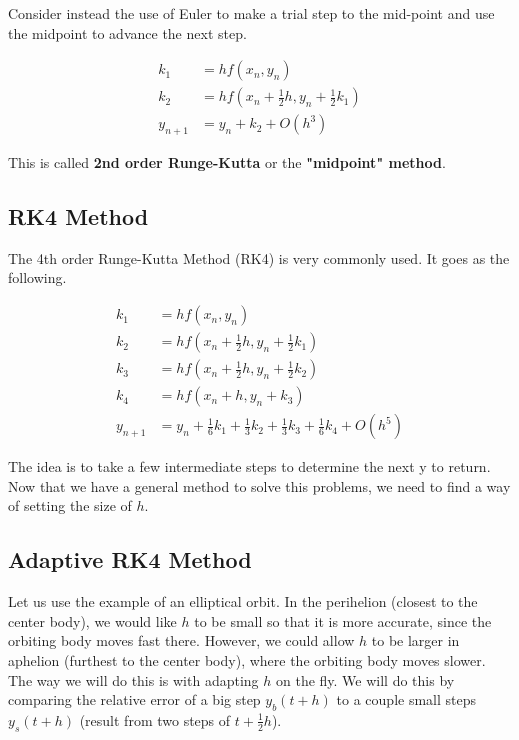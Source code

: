 \documentclass[]{article}
\begin{document}
Consider instead the use of Euler to make a trial step to the mid-point and use the midpoint to advance the next step.

\begin{align*}
	k_1 &= hf(x_n, y_n)\\
	k_2 &= hf(x_n+\frac{1}{2}h, y_n+\frac{1}{2}k_1)\\
	y_{n+1} &= y_n + k_2 + O(h^3)
\end{align*}

This is called \textbf{2nd order Runge-Kutta} or the \textbf{"midpoint" method}.\\

\subsection{RK4 Method}\bigbreak

The 4th order Runge-Kutta Method (RK4) is very commonly used. It goes as the following.

\begin{align*}
	k_1 &= hf(x_n, y_n)\\
	k_2 &= hf(x_n+\frac{1}{2}h, y_n+\frac{1}{2}k_1)\\
	k_3 &= hf(x_n+\frac{1}{2}h, y_n+\frac{1}{2}k_2)\\
	k_4 &= hf(x_n + h, y_n + k_3)\\
	y_{n+1} &= y_n + \frac{1}{6}k_1 + \frac{1}{3}k_2 + \frac{1}{3}k_3 + \frac{1}{6}k_4 + O(h^5)
\end{align*}

The idea is to take a few intermediate steps to determine the next y to return.\\

Now that we have a general method to solve this problems, we need to find a way of setting the size of $h$.\\

\subsection{Adaptive RK4 Method}\bigbreak

Let us use the example of an elliptical orbit. In the perihelion (closest to the center body), we would like $h$ to be small so that it is more accurate, since the orbiting body moves fast there. However, we could allow $h$ to be larger in aphelion (furthest to the center body), where the orbiting body moves slower. \\

The way we will do this is with adapting $h$ on the fly. We will do this by comparing the relative error of a big step $y_b(t+h)$ to a couple small steps $y_s(t+h)$ (result from two steps of $t+\frac{1}{2}h$).\\
\end{document}
